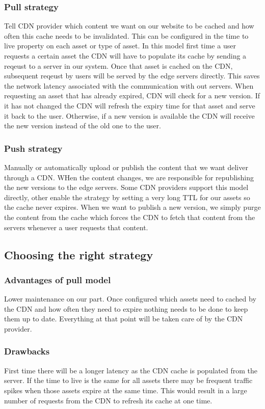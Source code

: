 \subsubsection{Pull strategy}
Tell CDN provider which content we want on our website to be cached and how often this cache needs to be invalidated.
This can be configured in the time to live property on each asset or type of asset.
In this model first time a user requests a certain asset the CDN will have to populate its cache by sending a reqeust to a server in our system.
Once that asset is cached on the CDN, subsequent reqeust by users will be served by the edge servers directly.
This saves the network latency associated with the communication with out servers.
When requesting an asset that has already expired, CDN will check for a new version.
If it has not changed the CDN will refresh the expiry time for that asset and serve it back to the user.
Otherwise, if a new version is available the CDN will receive the new version instead of the old one to the user.

\subsubsection{Push strategy}
Manually or automatically upload or publish the content that we want deliver through a CDN.
WHen the content changes, we are responsible for republishing the new versions to the edge servers.
Some CDN providers support this model directly, other enable the strategy by setting a very long TTL for our assets so the cache never expires.
When we want to publish a new version, we simply purge the content from the cache which forces the CDN to fetch that content from the servers whenever a user requests that content.

\subsection{Choosing the right strategy}

\subsubsection{Advantages of pull model}
Lower maintenance on our part.
Once configured which assets need to cached by the CDN and how often they need to expire nothing needs to be done to keep them up to date.
Everything at that point will be taken care of by the CDN provider.

\subsubsection{Drawbacks}
First time there will be a longer latency as the CDN cache is populated from the server.
If the time to live is the same for all assets there may be frequent traffic spikes when those assets expire at the same time.
This would result in a large number of requests from the CDN to refresh its cache at one time.

